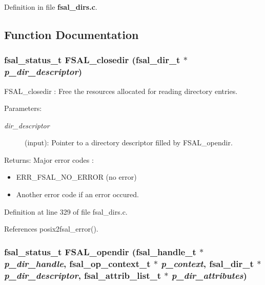 Definition in file {\bf fsal\_\-dirs.c}.

\subsection{Function Documentation}
\subsubsection[{FSAL\_\-closedir}]{\setlength{\rightskip}{0pt plus 5cm}fsal\_\-status\_\-t FSAL\_\-closedir (fsal\_\-dir\_\-t $\ast$ {\em p\_\-dir\_\-descriptor})}\label{fsal__dirs_8c_23fcbb2bc230e9a10d84ad210c3b2150}


FSAL\_\-closedir : Free the resources allocated for reading directory entries.

\begin{Desc}
\item[Parameters:]
\begin{description}
\item[{\em dir\_\-descriptor}](input): Pointer to a directory descriptor filled by FSAL\_\-opendir.\end{description}
\end{Desc}
\begin{Desc}
\item[Returns:]Major error codes :\begin{itemize}
\item ERR\_\-FSAL\_\-NO\_\-ERROR (no error)\item Another error code if an error occured. \end{itemize}
\end{Desc}


Definition at line 329 of file fsal\_\-dirs.c.

References posix2fsal\_\-error().
\subsubsection[{FSAL\_\-opendir}]{\setlength{\rightskip}{0pt plus 5cm}fsal\_\-status\_\-t FSAL\_\-opendir (fsal\_\-handle\_\-t $\ast$ {\em p\_\-dir\_\-handle}, \/  fsal\_\-op\_\-context\_\-t $\ast$ {\em p\_\-context}, \/  fsal\_\-dir\_\-t $\ast$ {\em p\_\-dir\_\-descriptor}, \/  fsal\_\-attrib\_\-list\_\-t $\ast$ {\em p\_\-dir\_\-attributes})}\label{fsal__dirs_8c_85ca24a067cf5cb8bbe4588b79cbe534}


